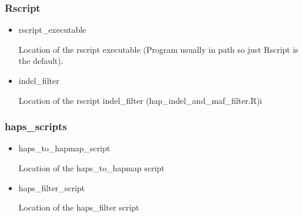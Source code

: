 \documentclass[a4paper,10pt]{article}
\begin{document}
\subsubsection{Rscript}
\begin{itemize}
\item rscript\_executable

Location of the rscript executable (Program usually in path so just Rscript is the default).
\item indel\_filter

Location of the rscript indel\_filter (hap\_indel\_and\_maf\_filter.R)i
\end{itemize}
\subsubsection{haps\_scripts}
\begin{itemize}
\item haps\_to\_hapmap\_script 

Location of the haps\_to\_hapmap script

\item haps\_filter\_script

Location of the haps\_filter script

\end{itemize}
\end{document}
